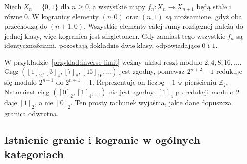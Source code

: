 \begin{przyklad}
Niech $X_n=\{0,1\}$ dla $n\geq0$, a wszystkie mapy $f_n:X_n\to X_{n+1}$ będą stałe i równe $0$. W kogranicy elementy $(n,0)$ oraz $(n,1)$ są utożsamione, gdyż oba przechodzą do $(n+1,0)$. Wszystkie elementy całej sumy rozłącznej należą do jednej klasy, więc kogranica jest singletonem. Gdy zamiast tego wszystkie $f_n$ są identycznościami, pozostają dokładnie dwie klasy, odpowiadające $0$ i $1$.
\end{przyklad}

\begin{przyklad}
W przykładzie~\ref{przyklad:inverse-limit} weźmy układ reszt modulo $2,4,8,16,\ldots$. Ciąg $([1]_2,[3]_4,[7]_8,[15]_{16},\ldots)$ jest zgodny, ponieważ $2^{n+2}-1$ redukuje się modulo $2^{n+1}$ do $2^{n+1}-1$. Reprezentuje on liczbę $-1$ w pierścieniu $\mathbb Z_2$. Natomiast ciąg $([0]_2,[1]_4,\ldots)$ nie jest zgodny: $[1]_4$ po redukcji modulo $2$ daje $[1]_2$, a nie $[0]_2$. Ten prosty rachunek wyjaśnia, jakie dane dopuszcza granica odwrotna.
\end{przyklad}

\subsection{Istnienie granic i kogranic w ogólnych kategoriach}

